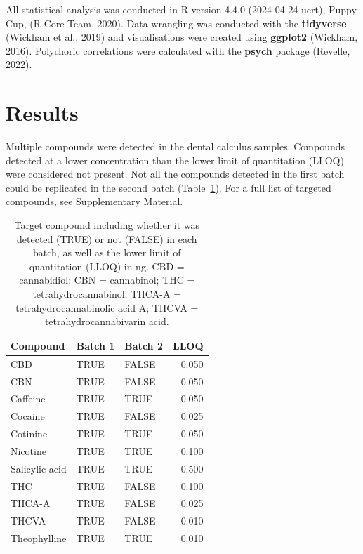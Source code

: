 \documentclass[
]{article}
\begin{document}
All statistical analysis was conducted in R version 4.4.0 (2024-04-24
ucrt), Puppy Cup, (R Core Team, 2020). Data wrangling was conducted with
the \textbf{tidyverse} (Wickham et al., 2019) and visualisations were
created using \textbf{ggplot2} (Wickham, 2016). Polychoric correlations
were calculated with the \textbf{psych} package (Revelle, 2022).

\section{Results}\label{results}

Multiple compounds were detected in the dental calculus samples.
Compounds detected at a lower concentration than the lower limit of
quantitation (LLOQ) were considered not present. Not all the compounds
detected in the first batch could be replicated in the second batch
(Table~\ref{tbl-compound-detect}). For a full list of targeted
compounds, see Supplementary Material.

\begin{longtable}[]{@{}lllr@{}}

\caption{\label{tbl-compound-detect}Target compound including whether it
was detected (TRUE) or not (FALSE) in each batch, as well as the lower
limit of quantitation (LLOQ) in ng. CBD = cannabidiol; CBN = cannabinol;
THC = tetrahydrocannabinol; THCA-A = tetrahydrocannabinolic acid A;
THCVA = tetrahydrocannabivarin acid.}

\tabularnewline

\toprule\noalign{}
Compound & Batch 1 & Batch 2 & LLOQ \\
\midrule\noalign{}
\endhead
\bottomrule\noalign{}
\endlastfoot
CBD & TRUE & FALSE & 0.050 \\
CBN & TRUE & FALSE & 0.050 \\
Caffeine & TRUE & TRUE & 0.050 \\
Cocaine & TRUE & FALSE & 0.025 \\
Cotinine & TRUE & TRUE & 0.050 \\
Nicotine & TRUE & TRUE & 0.100 \\
Salicylic acid & TRUE & TRUE & 0.500 \\
THC & TRUE & FALSE & 0.100 \\
THCA-A & TRUE & FALSE & 0.025 \\
THCVA & TRUE & FALSE & 0.010 \\
Theophylline & TRUE & TRUE & 0.010 \\

\end{longtable}
\end{document}
